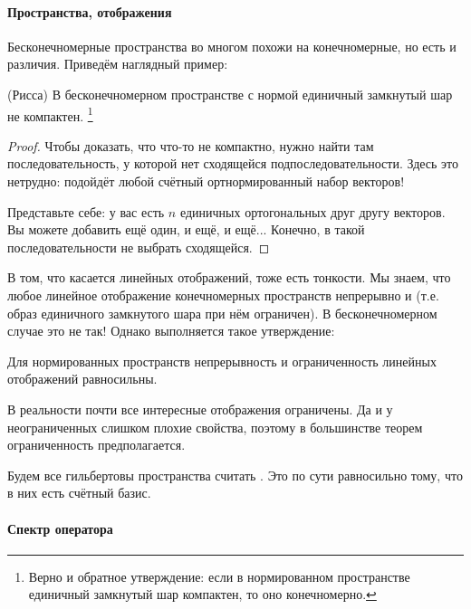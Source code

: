 \documentclass{trlnotes}
\begin{document}
    \paragraph{Пространства, отображения}
    Бесконечномерные пространства во многом похожи на конечномерные, но есть и различия. Приведём наглядный пример:

    \begin{thm}(Рисса)
        В бесконечномерном пространстве с нормой единичный замкнутый шар не компактен. \footnote{Верно и обратное утверждение: если в нормированном пространстве единичный замкнутый шар компактен, то оно конечномерно.}
        \begin{proof}
            Чтобы доказать, что что-то не компактно, нужно найти там последовательность, у которой нет сходящейся подпоследовательности. Здесь это нетрудно: подойдёт любой счётный ортнормированный набор векторов!

            Представьте себе: у вас есть $n$ единичных ортогональных друг другу векторов. Вы можете добавить ещё один, и ещё, и ещё... Конечно, в такой последовательности не выбрать сходящейся.
        \end{proof}
    \end{thm}

    В том, что касается линейных отображений, тоже есть тонкости. Мы знаем, что любое линейное отображение конечномерных пространств непрерывно и  (т.е. образ единичного замкнутого шара при нём ограничен). В бесконечномерном случае это не так! Однако выполняется такое утверждение:

    \begin{st}
        Для нормированных пространств непрерывность и ограниченность линейных отображений равносильны.
    \end{st}

    В реальности почти все интересные отображения ограничены. Да и у неограниченных слишком плохие свойства, поэтому в большинстве теорем ограниченность предполагается.

    \begin{rem}
        Будем все гильбертовы пространства считать . Это по сути равносильно тому, что в них есть счётный базис.
    \end{rem}

    \paragraph{Спектр оператора}
\end{document}

